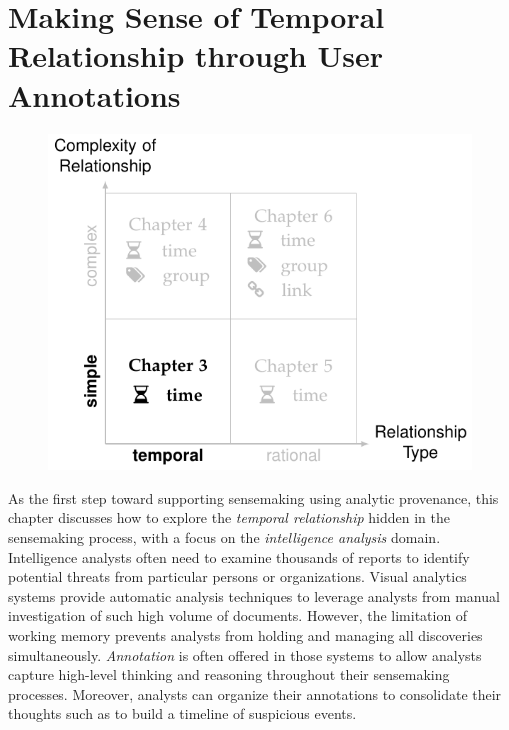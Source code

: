 \chapter{Making Sense of Temporal Relationship through User Annotations}
\label{chap:schemaline}

\graphicspath{{Chapter3/figures/}}

\begin{figure}[!htb]
	\centering
	\includegraphics{work}
\end{figure}

\vspace{1in}

		
\pagebreak
As the first step toward supporting sensemaking using analytic provenance, this chapter discusses how to explore the \emph{temporal relationship} hidden in the sensemaking process, with a focus on the \emph{intelligence analysis} domain. Intelligence analysts often need to examine thousands of reports to identify potential threats from particular persons or organizations. Visual analytics systems provide automatic analysis techniques to leverage analysts from manual investigation of such high volume of documents. However, the limitation of working memory prevents analysts from holding and managing all discoveries simultaneously. \emph{Annotation} is often offered in those systems to allow analysts capture high-level thinking and reasoning throughout their sensemaking processes. Moreover, analysts can organize their annotations to consolidate their thoughts such as to build a timeline of suspicious events.


